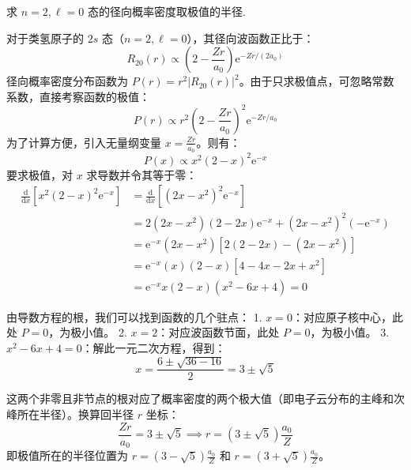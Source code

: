 \begin{exercise}\label{ex:25.5}
求 $n=2, \ell=0$ 态的径向概率密度取极值的半径.
\end{exercise}
\begin{solution}
对于类氢原子的 $2s$ 态（$n=2, \ell=0$），其径向波函数正比于：
$$ R_{20}(r) \propto \left( 2 - \frac{Zr}{a_0} \right) \mathrm{e}^{-Zr/(2a_0)} $$
径向概率密度分布函数为 $P(r) = r^2 |R_{20}(r)|^2$。由于只求极值点，可忽略常数系数，直接考察函数的极值：
$$ P(r) \propto r^2 \left( 2 - \frac{Zr}{a_0} \right)^2 \mathrm{e}^{-Zr/a_0} $$
为了计算方便，引入无量纲变量 $x = \frac{Zr}{a_0}$。则有：
$$ P(x) \propto x^2 (2 - x)^2 \mathrm{e}^{-x} $$
要求极值，对 $x$ 求导数并令其等于零：
\begin{align*}
    \frac{\mathrm{d}}{\mathrm{d}x} \left[ x^2 (2 - x)^2 \mathrm{e}^{-x} \right] &= \frac{\mathrm{d}}{\mathrm{d}x} \left[ (2x - x^2)^2 \mathrm{e}^{-x} \right] \\
    &= 2(2x - x^2)(2 - 2x) \mathrm{e}^{-x} + (2x - x^2)^2 (-\mathrm{e}^{-x}) \\
    &= \mathrm{e}^{-x} (2x - x^2) \left[ 2(2 - 2x) - (2x - x^2) \right] \\
    &= \mathrm{e}^{-x} (x)(2 - x) \left[ 4 - 4x - 2x + x^2 \right] \\
    &= \mathrm{e}^{-x} x (2 - x) (x^2 - 6x + 4) = 0
\end{align*}

由导数方程的根，我们可以找到函数的几个驻点：
1. $x = 0$：对应原子核中心，此处 $P=0$，为极小值。
2. $x = 2$：对应波函数节面，此处 $P=0$，为极小值。
3. $x^2 - 6x + 4 = 0$：解此一元二次方程，得到：
$$ x = \frac{6 \pm \sqrt{36 - 16}}{2} = 3 \pm \sqrt{5} $$

这两个非零且非节点的根对应了概率密度的两个极大值（即电子云分布的主峰和次峰所在半径）。换算回半径 $r$ 坐标：
$$ \frac{Zr}{a_0} = 3 \pm \sqrt{5} \implies r = (3 \pm \sqrt{5}) \frac{a_0}{Z} $$
即极值所在的半径位置为 $r = (3 - \sqrt{5})\frac{a_0}{Z}$ 和 $r = (3 + \sqrt{5})\frac{a_0}{Z}$。
\end{solution}

